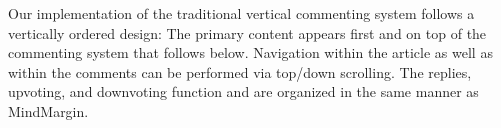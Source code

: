    
Our implementation of the traditional vertical commenting system follows a vertically ordered design: The primary content appears first and on top of the commenting system that follows below. Navigation within the article as well as within the comments can be performed via top/down scrolling. The replies, upvoting, and downvoting function and are organized in the same manner as MindMargin.